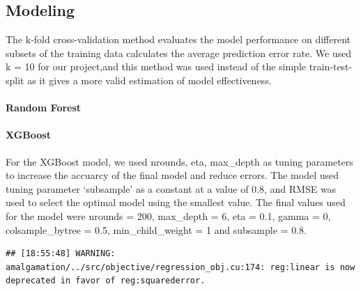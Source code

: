 \documentclass[11pt,]{article}
\begin{document}
\hypertarget{modeling}{%
\subsection{Modeling}\label{modeling}}

The k-fold cross-validation method evaluates the model performance on
different subsets of the training data calculates the average prediction
error rate. We used k = 10 for our project,and this method was used
instead of the simple train-test-split as it gives a more valid
estimation of model effectiveness.

\hypertarget{random-forest}{%
\paragraph{\texorpdfstring{\textbf{Random Forest}\\
}{Random Forest }}\label{random-forest}}

\hypertarget{xgboost}{%
\paragraph{\texorpdfstring{\textbf{XGBoost}\\
}{XGBoost }}\label{xgboost}}

For the XGBoost model, we used nrounds, eta, max\_depth as tuning
parameters to increase the accuarcy of the final model and reduce
errors. The model used tuning parameter `subsample' as a constant at a
value of 0.8, and RMSE was used to select the optimal model using the
smallest value. The final values used for the model were nrounds = 200,
max\_depth = 6, eta = 0.1, gamma = 0, colsample\_bytree = 0.5,
min\_child\_weight = 1 and subsample = 0.8.

\begin{verbatim}
## [18:55:48] WARNING: amalgamation/../src/objective/regression_obj.cu:174: reg:linear is now deprecated in favor of reg:squarederror.
\end{verbatim}
\end{document}
